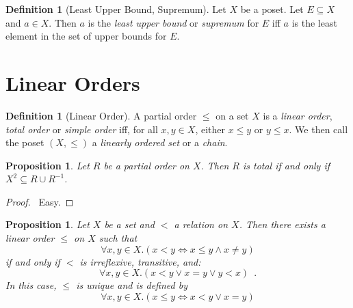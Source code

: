 \documentclass{report}
\let\qed\relax
\newtheorem{prop}[ax]{Proposition}
\theoremstyle{definition}
\newtheorem{df}[ax]{Definition}
\begin{document}
\begin{df}[Least Upper Bound, Supremum]
Let $X$ be a poset. Let $E \subseteq X$ and $a \in X$. Then $a$ is the \emph{least upper bound} or \emph{supremum} for $E$ iff $a$ is the least element in the set of upper bounds for $E$.
\end{df}

\section{Linear Orders}

\begin{df}[Linear Order]
A partial order $\leq$ on a set $X$ is a \emph{linear order}, \emph{total order} or \emph{simple order} iff, for all $x,y \in X$, either $x \leq y$ or $y \leq x$.
We then call the poset $(X, \leq)$ a \emph{linearly ordered set} or a \emph{chain}.
\end{df}

\begin{prop}
Let $R$ be a partial order on $X$. Then $R$ is total if and only if $X^2 \subseteq R \cup R^{-1}$.
\end{prop}

\begin{proof}
\pf\ Easy. \qed
\end{proof}

\begin{prop}
Let $X$ be a set and $<$ a relation on $X$. Then there exists a linear order $\leq$ on $X$ such that
\[ \forall x,y \in X. (x < y \Leftrightarrow x \leq y \wedge x \neq y) \]
if and only if $<$ is irreflexive, transitive, and:
\[ \forall x,y \in X. (x < y \vee x = y \vee y < x) \enspace . \]
In this case, $\leq$ is unique and is defined by
\[ \forall x,y \in X. (x \leq y \Leftrightarrow x < y \vee x = y) \]
\end{prop}
\end{document}
